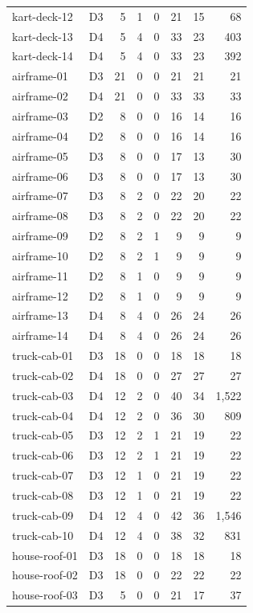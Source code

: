 \begin{longtable}{p{}lrrrrrr}
kart-deck-12 & D3 & 5 & 1 & 0 & 21 & 15 & 68\\
kart-deck-13 & D4 & 5 & 4 & 0 & 33 & 23 & 403\\
kart-deck-14 & D4 & 5 & 4 & 0 & 33 & 23 & 392\\
airframe-01 & D3 & 21 & 0 & 0 & 21 & 21 & 21\\
airframe-02 & D4 & 21 & 0 & 0 & 33 & 33 & 33\\
airframe-03 & D2 & 8 & 0 & 0 & 16 & 14 & 16\\
airframe-04 & D2 & 8 & 0 & 0 & 16 & 14 & 16\\
airframe-05 & D3 & 8 & 0 & 0 & 17 & 13 & 30\\
airframe-06 & D3 & 8 & 0 & 0 & 17 & 13 & 30\\
airframe-07 & D3 & 8 & 2 & 0 & 22 & 20 & 22\\
airframe-08 & D3 & 8 & 2 & 0 & 22 & 20 & 22\\
airframe-09 & D2 & 8 & 2 & 1 & 9 & 9 & 9\\
airframe-10 & D2 & 8 & 2 & 1 & 9 & 9 & 9\\
airframe-11 & D2 & 8 & 1 & 0 & 9 & 9 & 9\\
airframe-12 & D2 & 8 & 1 & 0 & 9 & 9 & 9\\
airframe-13 & D4 & 8 & 4 & 0 & 26 & 24 & 26\\
airframe-14 & D4 & 8 & 4 & 0 & 26 & 24 & 26\\
truck-cab-01 & D3 & 18 & 0 & 0 & 18 & 18 & 18\\
truck-cab-02 & D4 & 18 & 0 & 0 & 27 & 27 & 27\\
truck-cab-03 & D4 & 12 & 2 & 0 & 40 & 34 & 1,522\\
truck-cab-04 & D4 & 12 & 2 & 0 & 36 & 30 & 809\\
truck-cab-05 & D3 & 12 & 2 & 1 & 21 & 19 & 22\\
truck-cab-06 & D3 & 12 & 2 & 1 & 21 & 19 & 22\\
truck-cab-07 & D3 & 12 & 1 & 0 & 21 & 19 & 22\\
truck-cab-08 & D3 & 12 & 1 & 0 & 21 & 19 & 22\\
truck-cab-09 & D4 & 12 & 4 & 0 & 42 & 36 & 1,546\\
truck-cab-10 & D4 & 12 & 4 & 0 & 38 & 32 & 831\\
house-roof-01 & D3 & 18 & 0 & 0 & 18 & 18 & 18\\
house-roof-02 & D3 & 18 & 0 & 0 & 22 & 22 & 22\\
house-roof-03 & D3 & 5 & 0 & 0 & 21 & 17 & 37\\

\end{longtable}
